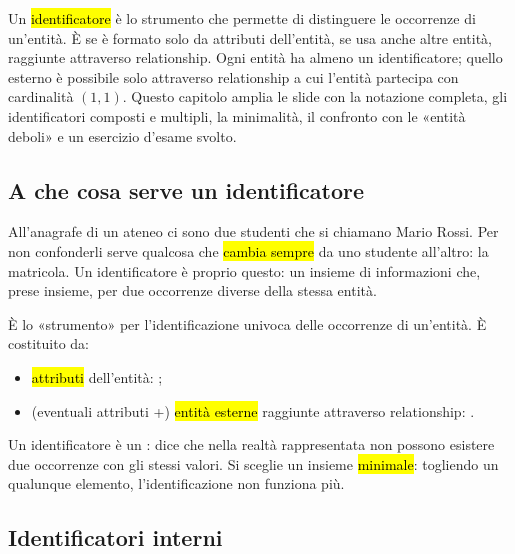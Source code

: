 
\begin{inbreve}
Un \hl{identificatore} è lo strumento che permette di distinguere  le occorrenze di un'entità. È  se è formato solo da attributi dell'entità,  se usa anche altre entità, raggiunte attraverso relationship. Ogni entità ha almeno un identificatore; quello esterno è possibile solo attraverso relationship a cui l'entità partecipa con cardinalità $(1,1)$. Questo capitolo amplia le slide con la notazione completa, gli identificatori composti e multipli, la minimalità, il confronto con le «entità deboli» e un esercizio d'esame svolto.
\end{inbreve}

\subsection{A che cosa serve un identificatore}

\begin{intuizione}
All'anagrafe di un ateneo ci sono due studenti che si chiamano Mario Rossi. Per non confonderli serve qualcosa che \hl{cambia sempre} da uno studente all'altro: la matricola. Un identificatore è proprio questo: un insieme di informazioni che, prese insieme,  per due occorrenze diverse della stessa entità.
\end{intuizione}

\begin{tecnica}
È lo «strumento» per l'identificazione univoca delle occorrenze di un'entità. È costituito da:
\begin{itemize}
  \item \hl{attributi} dell'entità: ;
  \item (eventuali attributi +) \hl{entità esterne} raggiunte attraverso relationship: .
\end{itemize}
Un identificatore è un : dice che nella realtà rappresentata non possono esistere due occorrenze con gli stessi valori. Si sceglie un insieme \hl{minimale}: togliendo un qualunque elemento, l'identificazione non funziona più.
\end{tecnica}

\subsection{Identificatori interni}

